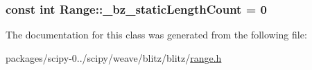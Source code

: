 \subsubsection[{\+\_\+bz\+\_\+static\+Length\+Count}]{\setlength{\rightskip}{0pt plus 5cm}const int Range\+::\+\_\+bz\+\_\+static\+Length\+Count = 0\hspace{0.3cm}{\ttfamily [static]}}\label{classRange_a4a4f7cb18880893a26e8e1bc44b1b66b}


The documentation for this class was generated from the following file\+:\begin{DoxyCompactItemize}
\item 
packages/scipy-\/0../scipy/weave/blitz/blitz/\hyperlink{range_8h}{range.\+h}\end{DoxyCompactItemize}
